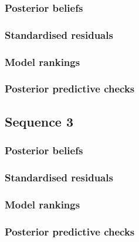 \subsubsection{Posterior beliefs}

\subsubsection{Standardised residuals}

\subsubsection{Model rankings}

\subsubsection{Posterior predictive checks}

\subsection{Sequence 3}

\subsubsection{Posterior beliefs}

\subsubsection{Standardised residuals}

\subsubsection{Model rankings}

\subsubsection{Posterior predictive checks}



